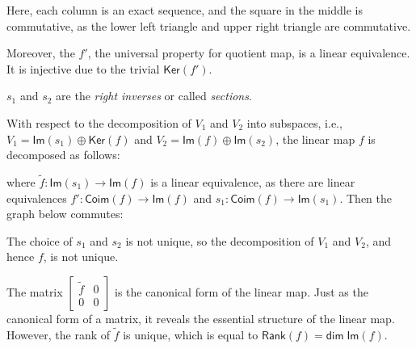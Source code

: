 \documentclass[
	11pt, %
	fleqn, %
	a4paper, %
]{LegrandOrangeBook}
\renewcommand{\ker}[1]{\mathsf{Ker}(#1)} %
\renewcommand{\Im}[1]{\mathsf{Im}(#1)} %
\newcommand{\rank}[1]{\mathsf{Rank}(#1)} %
\newcommand{\coim}[1]{\mathsf{Coim}(#1)} %
\renewcommand{\dim}{\mathsf{dim\;}} %
\begin{document}
Here, each column is an exact sequence, and the square in the middle is commutative, as the lower left triangle and upper right triangle are commutative.

Moreover, the $f'$, the universal property for quotient map, is a linear equivalence. It is injective due to the trivial $\ker{f'}$. 

$s_1$ and $s_2$ are the \emph{right inverses} or called \emph{sections}.

With respect to the decomposition of $V_1$ and $V_2$ into subspaces, i.e., $V_1 = \Im{s_1} \oplus \ker{f}$ and $V_2 = \Im{f} \oplus \Im{s_2}$, the linear map $f$ is decomposed as follows:
\begin{center}
\end{center}
where $\tilde{f} : \Im{s_1} \to \Im{f}$ is a linear equivalence, as there are linear equivalences $f' : \coim{f} \to \Im{f}$ and $s_1 : \coim{f} \to \Im{s_1}$. Then the graph below commutes:

\begin{center}
\end{center}
\begin{remark}
    The choice of $s_1$ and $s_2$ is not unique, so the decomposition of $V_1$ and $V_2$, and hence $f$, is not unique.
\end{remark}

The matrix $\begin{bmatrix}
    \tilde{f} & 0 \\
    0 & 0
\end{bmatrix}$ is the canonical form of the linear map. Just as the canonical form of a matrix, it reveals the essential structure of the linear map. However, the rank of $\tilde{f}$ is unique, which is equal to $\rank{f} = \dim{\Im{f}}$.
\end{document}
